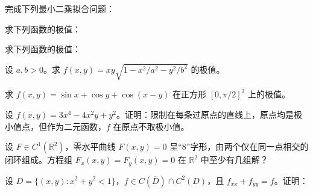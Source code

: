 \newpage
\noindent\begin{minipage}{\textwidth}
完成下列最小二乘拟合问题：
\end{minipage}\par\vfill
\noindent\begin{minipage}{\textwidth}
求下列函数的极值：
\end{minipage}\par\vfill
\noindent\begin{minipage}{\textwidth}
求下列函数的极值：
\end{minipage}\par\vfill
\newpage
\noindent\begin{minipage}{\textwidth}
设 $a,b>0$。求 $f(x,y)=xy\sqrt{1-x^2/a^2-y^2/b^2}$ 的极值。
\end{minipage}\par\vfill
\noindent\begin{minipage}{\textwidth}
求 $f(x,y)=\sin x+\cos y+\cos(x-y)$ 在正方形 $[0,\pi/2]^2$ 上的极值。
\end{minipage}\par\vfill
\noindent\begin{minipage}{\textwidth}
设 $f(x,y)=3x^4-4x^2y+y^2$。证明：限制在每条过原点的直线上，原点均是极小值点，但作为二元函数，$f$ 在原点不取极小值。
\end{minipage}\par\vfill
\newpage
\noindent\begin{minipage}{\textwidth}
设 $F\in C^1(\mathbb R^2)$，零水平曲线 $F(x,y)=0$ 呈“8”字形，由两个仅在同一点相交的闭环组成。方程组 $F_x(x,y)=F_y(x,y)=0$ 在 $\mathbb R^2$ 中至少有几组解？
\end{minipage}\par\vfill
\noindent\begin{minipage}{\textwidth}
设 $D=\{(x,y):x^2+y^2<1\}$，$f\in C(\overline D)\cap C^2(D)$，且 $f_{xx}+f_{yy}=f$。证明：
\end{minipage}\par\vfill
